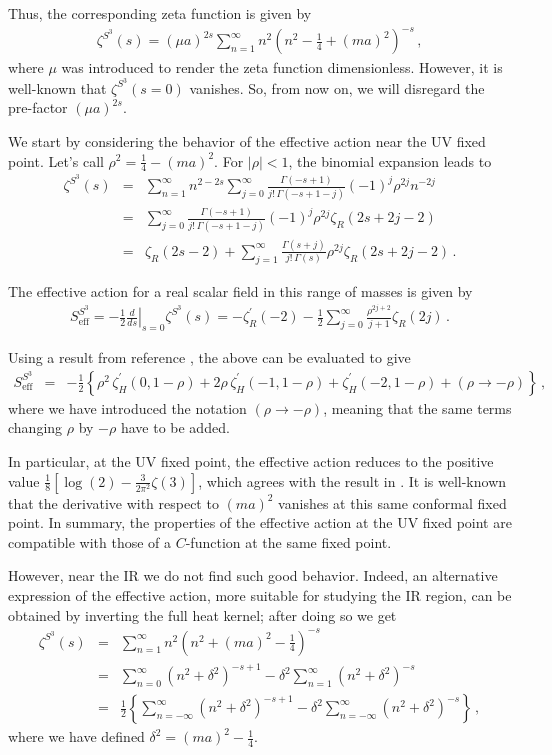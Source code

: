 \documentclass[12pt,a4paper]{article}
\newcommand{\beq}{\begin{eqnarray}}
\newcommand{\eeq}{\end{eqnarray}}
\newcommand{\nn}{\nonumber}
\numberwithin{equation}{section}
\begin{document}
Thus, the corresponding zeta function is given by
\beq
\zeta^{S^3}(s)=
(\mu a)^{2s} \sum_{n=1}^{\infty} n^2 \left(n^2 -\frac{1}{4} + (ma)^2\right)^{-s} \,,
\eeq
where $\mu$ was introduced to render the zeta function dimensionless. However, it is well-known that $\zeta^{S^3}(s=0)$ vanishes. So, from now on, we will disregard the pre-factor $(\mu a)^{2s}$.

We start by considering the behavior of the effective action near the UV fixed point. Let's call ${\rho}^2 =\frac{1}{4} - (ma)^2 $. For $ |\rho |< 1$, the binomial expansion leads to
\beq
\zeta^{S^3}(s)&=&
\sum_{n=1}^{\infty} n^{2-2s} \sum_{j=0}^{\infty} \frac{\Gamma(-s+1)}{j!\,\Gamma(-s+1-j)} (-1)^j {\rho}^{2j} n^{-2j}\nn \\
&=& \sum_{j=0}^{\infty} \frac{\Gamma(-s+1)}{j!\,\Gamma(-s+1-j)} (-1)^j {\rho}^{2j} \zeta_R (2s+2j-2)
\nn \\
&=& \zeta_R (2s-2) + \sum_{j=1}^{\infty} \frac{\Gamma(s+j)}{j!\,\Gamma(s)} {\rho}^{2j} \zeta_R (2s+2j-2)\,.
\eeq

The effective action for a real scalar field in this range of masses is given by
\beq
S_{\mathrm{eff}}^{S^3} = \left. -\frac12 \frac{d}{ds} \right\vert_{s=0} \zeta^{S^3}(s) = - \zeta^{\prime}_R (-2) - \frac12 \sum_{j=0}^{\infty} \frac{{\rho}^{2j +2}}{j+1} \zeta_R (2j)\,.
\eeq

Using a result from reference \cite{sri}, the above can be evaluated to give
\beq
S_{\mathrm{eff}}^{S^3} &=&-\frac12 \left\{ {\rho}^{2} \,\zeta^{\prime}_H (0, 1-\rho) +
2 {\rho} \,\zeta^{\prime}_H (-1, 1-\rho)+\zeta^{\prime}_H (-2, 1-\rho)+(\rho\rightarrow -\rho)\right\}\,,
\label{seffs3}\eeq
where we have introduced the notation $(\rho\rightarrow -\rho)$, meaning that the same terms changing $\rho$ by $-\rho$ have to be added.

In particular, at the UV fixed point, the effective action reduces to the positive value $\frac18 [\log(2) - \frac{3 }{2 {\pi}^2}\zeta(3)]$, which agrees with the result in \cite{kleF}. It is well-known that the derivative with respect to $(ma)^2$ vanishes at this same conformal fixed point. In summary, the properties of the effective action at the UV fixed point are compatible with those of a  $\textit{C}$-function at the same fixed point.

However, near the IR we do not find such good behavior. Indeed, an alternative expression of the effective action, more suitable for studying the IR region, can be obtained by inverting the full heat kernel; after doing so we get
\beq  \zeta^{S^3}(s) &=& \sum_{n=1}^{\infty} n^2 (n^2 + (ma)^2 -\frac{1}{4})^{-s}\nn \\
&=& \sum_{n=0}^{\infty} (n^2 + {\delta}^2 )^{-s+1} - {\delta}^2 \sum_{n=1}^{\infty} (n^2 + {\delta}^2 )^{-s}\nn \\
&=& \frac12 \left\{ \sum_{n=- \infty}^{\infty} (n^2 + {\delta}^2 )^{-s+1} - {\delta}^2 \sum_{n=-\infty}^{\infty} (n^2 + {\delta}^2 )^{-s}\right\}
\,, \nn\eeq
where we have defined ${\delta}^2= (ma)^2 - \frac14$.
\end{document}
